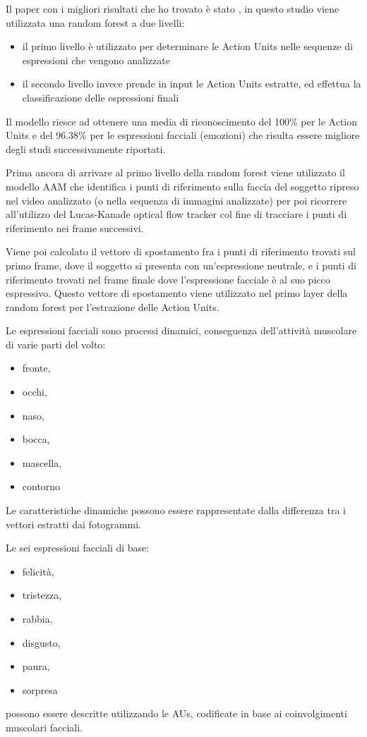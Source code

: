 Il paper con i migliori risultati che ho trovato è stato \cite{FaceExpreRecoImgSeqTwoFoldRandomForestClass}, in questo studio viene utilizzata una random forest a due livelli:
\begin{itemize}
    \item il primo livello è utilizzato per determinare le Action Units nelle sequenze di espressioni che vengono analizzate
    \item il secondo livello invece prende in input le Action Units estratte, ed effettua la classificazione delle espressioni finali
\end{itemize}

Il modello riesce ad ottenere una media di riconoscimento del 100\% per le Action Units e del 96.38\% per le espressioni facciali (emozioni) che risulta essere migliore degli studi successivamente riportati.

Prima ancora di arrivare al primo livello della random forest viene utilizzato il modello AAM che identifica i punti di riferimento sulla faccia del soggetto ripreso nel video analizzato (o nella sequenza di immagini analizzate) per poi ricorrere all’utilizzo del Lucas-Kanade optical flow tracker col fine di tracciare i punti di riferimento nei frame successivi.

Viene poi calcolato il vettore di spostamento fra i punti di riferimento trovati sul primo frame, dove il soggetto si presenta con un’espressione neutrale, e i punti di riferimento trovati nel frame finale dove l’espressione facciale è al suo picco espressivo. 
Questo vettore di spostamento viene utilizzato nel primo layer della random forest per l’estrazione delle Action Units.

Le espressioni facciali sono processi dinamici, conseguenza dell'attività muscolare di varie parti del volto:
\begin{itemize}
    \item fronte,
    \item occhi,
    \item naso,
    \item bocca,
    \item mascella,
    \item contorno
\end{itemize}

Le caratteristiche dinamiche possono essere rappresentate dalla differenza tra i vettori estratti dai fotogrammi. 

Le sei espressioni facciali di base:
\begin{itemize}
    \item felicità,
    \item tristezza,
    \item rabbia,
    \item disgusto,
    \item paura,
    \item sorpresa
\end{itemize}
possono essere descritte utilizzando le AUs, codificate in base ai coinvolgimenti muscolari facciali.

